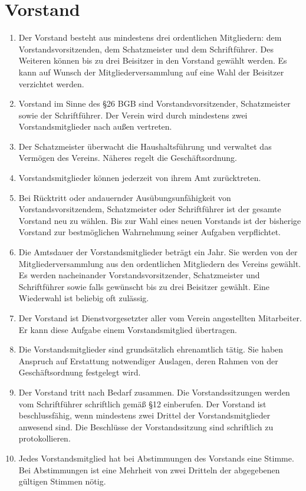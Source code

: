 \documentclass[a4paper,DIV10,12pt,headsepline]{scrartcl}
\begin{document}
\section{Vorstand}
\begin{enumerate}
	\item Der Vorstand besteht aus mindestens drei ordentlichen Mitgliedern: dem Vorstandsvorsitzenden, dem Schatzmeister und dem Schriftführer. Des Weiteren können bis zu drei Beisitzer in den Vorstand gewählt werden. Es kann auf Wunsch der Mitgliederversammlung auf eine Wahl der Beisitzer verzichtet werden.
	\item Vorstand im Sinne des \S 26 BGB sind Vorstandsvorsitzender, Schatzmeister sowie der Schriftführer. Der Verein wird durch mindestens zwei Vorstandsmitglieder nach außen vertreten.
	\item Der Schatzmeister überwacht die Haushaltsführung und verwaltet das Vermögen des Vereins. Näheres regelt die Geschäftsordnung.
	\item Vorstandsmitglieder können jederzeit von ihrem Amt zurücktreten.
	\item Bei Rücktritt oder andauernder Ausübungsunfähigkeit von Vorstandsvorsitzendem, Schatzmeister oder Schriftführer ist der gesamte Vorstand neu zu wählen. Bis zur Wahl eines neuen Vorstands ist der bisherige Vorstand zur bestmöglichen Wahrnehmung seiner Aufgaben verpflichtet.
	\item Die Amtsdauer der Vorstandsmitglieder beträgt ein Jahr. Sie werden von der Mitgliederversammlung aus den ordentlichen Mitgliedern des Vereins gewählt. Es werden nacheinander Vorstandsvorsitzender, Schatzmeister und Schriftführer sowie falls gewünscht bis zu drei Beisitzer gewählt. Eine Wiederwahl ist beliebig oft zulässig.
	\item Der Vorstand ist Dienstvorgesetzter aller vom Verein angestellten Mitarbeiter. Er kann diese Aufgabe einem Vorstandsmitglied übertragen.
	\item Die Vorstandsmitglieder sind grundsätzlich ehrenamtlich tätig. Sie haben Anspruch auf Erstattung notwendiger Auslagen, deren Rahmen von der Geschäftsordnung festgelegt wird.
	\item Der Vorstand tritt nach Bedarf zusammen. Die Vorstandssitzungen werden vom Schriftführer schriftlich gemäß \S 12 einberufen. Der Vorstand ist beschlussfähig, wenn mindestens zwei Drittel der Vorstandsmitglieder anwesend sind. Die Beschlüsse der Vorstandssitzung sind schriftlich zu protokollieren.
	\item Jedes Vorstandsmitglied hat bei Abstimmungen des Vorstands eine Stimme. Bei Abstimmungen ist eine Mehrheit von zwei Dritteln der abgegebenen gültigen Stimmen nötig.
\end{enumerate}
\end{document}
